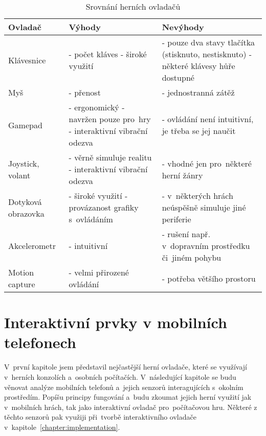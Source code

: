 \documentclass[thesis=B,czech,hidelinks]{FITthesis}[2012/06/26] %
\begin{document}
\begin{table}[h]
\caption{Srovnání herních ovladačů}
\begin{tabularx}{\textwidth}{|l|X|X|}
\hline
\textbf{Ovladač} & \textbf{Výhody} & \textbf{Nevýhody} \\ \hline
Klávesnice & - počet kláves \newline - široké využití & - pouze dva stavy tlačítka (stisknuto, nestisknuto) \newline - některé klávesy hůře dostupné \\ \hline
Myš & - přenost & - jednostranná zátěž \\ \hline
Gamepad & - ergonomický \newline - navržen pouze pro~hry \newline - interaktivní vibrační odezva & - ovládání není intuitivní, je třeba se jej naučit \\ \hline
Joystick, volant & - věrně simuluje realitu \newline - interaktivní vibrační odezva & - vhodné jen pro~některé herní žánry \\ \hline
Dotyková obrazovka & - široké využití \newline - provázanost grafiky s~ovládáním & - v~některých hrách neúspěšně simuluje jiné periferie \\ \hline
Akcelerometr & - intuitivní & - rušení např. v~dopravním prostředku či~jiném pohybu \\ \hline
Motion capture & - velmi přirozené ovládání & - potřeba většího prostoru \\ \hline

\end{tabularx}
\end{table}


\chapter{Interaktivní prvky v mobilních telefonech}

V~první kapitole jsem představil nejčastější herní ovladače, které se využívají v~herních konzolích a~osobních počítačích. V~následující kapitole se budu věnovat analýze mobilních telefonů a~jejich senzorů interagujících s~okolním prostředím. Popíšu principy fungování a~budu zkoumat jejich herní využití jak v~mobilních hrách, tak jako interaktivní ovladač pro~počítačovou hru. Některé z těchto senzorů pak využiji při~tvorbě interaktivního ovladače v~kapitole~\ref{chapter:implementation}.
\end{document}
